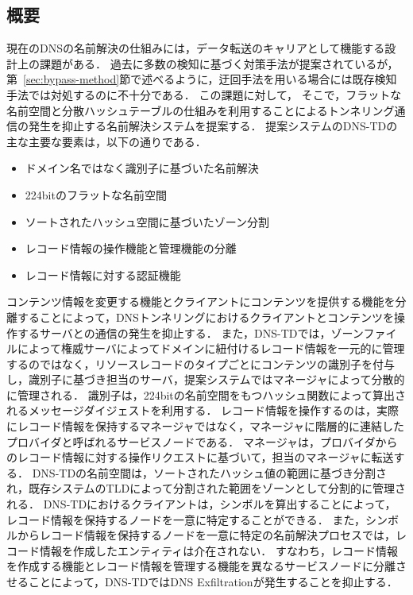 \subsection{概要}
\label{sec:DNS-TD}
現在のDNSの名前解決の仕組みには，データ転送のキャリアとして機能する設計上の課題がある．
過去に多数の検知に基づく対策手法が提案されているが，第~\ref{sec:bypass-method}節で述べるように，迂回手法を用いる場合には既存検知手法では対処するのに不十分である．
この課題に対して，
そこで，フラットな名前空間と分散ハッシュテーブルの仕組みを利用することによるトンネリング通信の発生を抑止する名前解決システムを提案する．
提案システムのDNS-TDの主な主要な要素は，以下の通りである．
\begin{itemize}
 \item ドメイン名ではなく識別子に基づいた名前解決
 \vspace{-3mm}
 \item 224bitのフラットな名前空間
 \vspace{-3mm}
 \item ソートされたハッシュ空間に基づいたゾーン分割
 \vspace{-3mm}
 \item レコード情報の操作機能と管理機能の分離
 \vspace{-3mm}
 \item レコード情報に対する認証機能
\end{itemize}
コンテンツ情報を変更する機能とクライアントにコンテンツを提供する機能を分離することによって，DNSトンネリングにおけるクライアントとコンテンツを操作するサーバとの通信の発生を抑止する．
また，DNS-TDでは，ゾーンファイルによって権威サーバによってドメインに紐付けるレコード情報を一元的に管理するのではなく，リソースレコードのタイプごとにコンテンツの識別子を付与し，識別子に基づき担当のサーバ，提案システムではマネージャによって分散的に管理される．
識別子は，224bitの名前空間をもつハッシュ関数によって算出されるメッセージダイジェストを利用する．
レコード情報を操作するのは，実際にレコード情報を保持するマネージャではなく，マネージャに階層的に連結したプロバイダと呼ばれるサービスノードである．
マネージャは，プロバイダからのレコード情報に対する操作リクエストに基づいて，担当のマネージャに転送する．
DNS-TDの名前空間は，ソートされたハッシュ値の範囲に基づき分割され，既存システムのTLDによって分割された範囲をゾーンとして分割的に管理される．
DNS-TDにおけるクライアントは，シンボルを算出することによって，レコード情報を保持するノードを一意に特定することができる．
また，シンボルからレコード情報を保持するノードを一意に特定の名前解決プロセスでは，レコード情報を作成したエンティティは介在されない．
すなわち，レコード情報を作成する機能とレコード情報を管理する機能を異なるサービスノードに分離させることによって，DNS-TDではDNS Exfiltrationが発生することを抑止する．

